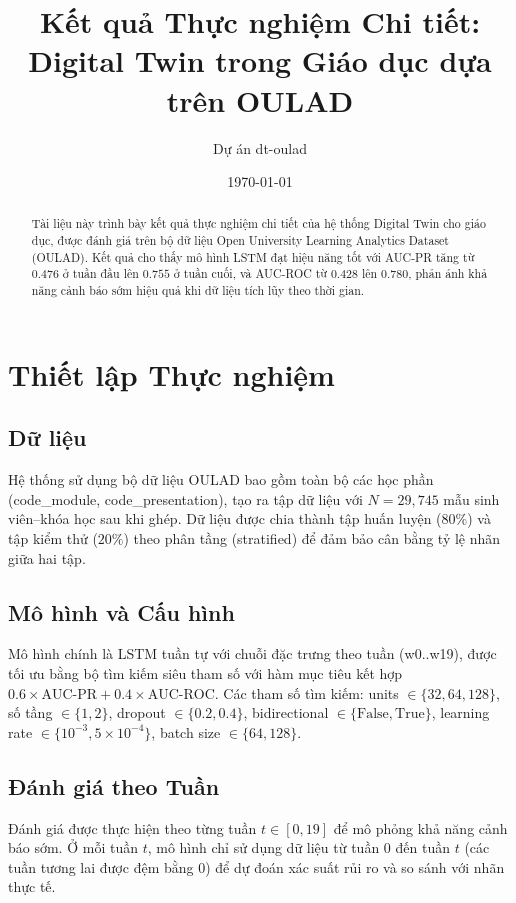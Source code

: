 \documentclass[12pt,a4paper]{article}
\begin{document}
\title{Kết quả Thực nghiệm Chi tiết:\\
Digital Twin trong Giáo dục dựa trên OULAD}
\author{Dự án dt-oulad}
\date{\today}
\maketitle

\begin{abstract}
Tài liệu này trình bày kết quả thực nghiệm chi tiết của hệ thống Digital Twin cho giáo dục, được đánh giá trên bộ dữ liệu Open University Learning Analytics Dataset (OULAD). Kết quả cho thấy mô hình LSTM đạt hiệu năng tốt với AUC-PR tăng từ $0.476$ ở tuần đầu lên $0.755$ ở tuần cuối, và AUC-ROC từ $0.428$ lên $0.780$, phản ánh khả năng cảnh báo sớm hiệu quả khi dữ liệu tích lũy theo thời gian.
\end{abstract}

\section{Thiết lập Thực nghiệm}

\subsection{Dữ liệu}
Hệ thống sử dụng bộ dữ liệu OULAD bao gồm toàn bộ các học phần (code\_module, code\_presentation), tạo ra tập dữ liệu với $N = 29,745$ mẫu sinh viên--khóa học sau khi ghép. Dữ liệu được chia thành tập huấn luyện ($80\%$) và tập kiểm thử ($20\%$) theo phân tầng (stratified) để đảm bảo cân bằng tỷ lệ nhãn giữa hai tập.

\subsection{Mô hình và Cấu hình}
Mô hình chính là LSTM tuần tự với chuỗi đặc trưng theo tuần (w0..w19), được tối ưu bằng bộ tìm kiếm siêu tham số với hàm mục tiêu kết hợp $0.6 \times \text{AUC-PR} + 0.4 \times \text{AUC-ROC}$. Các tham số tìm kiếm: units $\in \{32, 64, 128\}$, số tầng $\in \{1, 2\}$, dropout $\in \{0.2, 0.4\}$, bidirectional $\in \{\text{False}, \text{True}\}$, learning rate $\in \{10^{-3}, 5 \times 10^{-4}\}$, batch size $\in \{64, 128\}$.

\subsection{Đánh giá theo Tuần}
Đánh giá được thực hiện theo từng tuần $t \in [0, 19]$ để mô phỏng khả năng cảnh báo sớm. Ở mỗi tuần $t$, mô hình chỉ sử dụng dữ liệu từ tuần $0$ đến tuần $t$ (các tuần tương lai được đệm bằng $0$) để dự đoán xác suất rủi ro và so sánh với nhãn thực tế.
\end{document}

